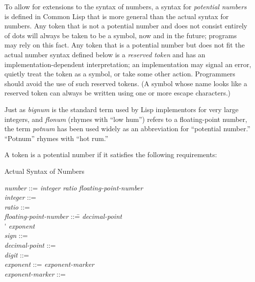 To allow for extensions to the syntax of numbers, a
syntax for \emph{potential numbers} is defined in Common Lisp that is
more general than the actual syntax for numbers.
Any token that is not a potential number and does not consist
entirely of dots will always be taken to be a symbol,
now and in the future; programs may rely on this fact.
Any token that is a potential number but does not fit the
actual number syntax defined below is a \emph{reserved token} and
has an implementation-dependent interpretation;
an implementation may signal an error, quietly treat the token
as a symbol, or take some other action.  Programmers should avoid
the use of such reserved tokens.  (A symbol whose name looks like a reserved
token can always be written using one or more escape characters.)

Just as \emph{bignum} is the standard term used by Lisp implementors for
very large integers, and \emph{flonum} (rhymes with ``low hum'') refers
to a floating-point number, the term \emph{potnum} has been used widely
as an abbreviation for ``potential number.''  ``Potnum'' rhymes with ``hot rum.''

\goodbreak

A token is a potential number if it satisfies the following
requirements:

\begin{table}[t]
\caption{Actual Syntax of Numbers}
\label{NUMBER-SYNTAX-TABLE}
\tabbingsep=0pt
\normalsize
\begin{tabbing}
\emph{number} ::= \emph{integer} {\Mor} \emph{ratio} {\Mor} \emph{floating-point-number} \\
\emph{integer} ::=    \\
\emph{ratio} ::=   \cdf{/}  \\
\emph{floating-point-number} ::=\=   \emph{decimal-point}   \\
\>{\Mor} \'   \emph{exponent} \\ \emph{sign} ::= \cdf{+} {\Mor} \cdf{-} \\
\emph{decimal-point} ::=  \\
\emph{digit} ::=  {\Mor}  {\Mor}  {\Mor}  {\Mor} 
         {\Mor}  {\Mor}  {\Mor}  {\Mor}  {\Mor}  \\
\emph{exponent} ::= \emph{exponent-marker}   \\
\emph{exponent-marker} ::=  {\Mor}  {\Mor}  {\Mor}  {\Mor} 
                   {\Mor}  {\Mor}  {\Mor}  {\Mor}  {\Mor} 
\end{tabbing}
\end{table}

